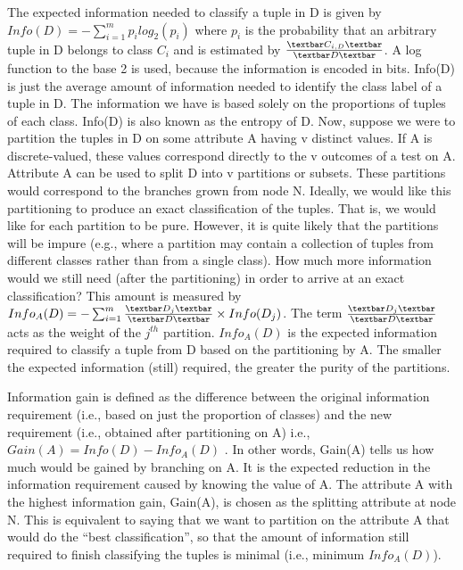 \documentclass{acm_proc_article-sp}
\begin{document}
The expected information needed to classify a tuple in D is given by $Info(D) = - \sum_{i=1}^{m} p_{i} log_{2}(p_{i})$ where $p_{i}$ is the probability that an arbitrary tuple in D belongs to class $C_{i}$ and is estimated by $\frac{\textbar C_{i,D} \textbar}{\textbar D\textbar}$. A log function to the base 2 is used, because the information is encoded in bits. Info(D) is just the average amount of information needed to identify the class label of a tuple in D. The information we have is based solely on the proportions of tuples of each class. Info(D) is also known as the entropy of D. Now, suppose we were to partition the tuples in D on some attribute A having v distinct values. If A is discrete-valued, these values correspond directly to the v outcomes of a test on A. Attribute A can be used to split D into v partitions or subsets. These partitions would correspond to the branches grown from node N. Ideally, we would like this partitioning to produce an exact classification of the tuples. That is, we would like for each partition to be pure. However, it is quite likely that the partitions will be impure (e.g., where a partition may contain a collection of tuples from different classes rather than from a single class). How much more information would we still need (after the partitioning) in order to arrive at an exact classification? This amount is measured by $Info_{A}(D) = - \sum_{i=1}^{m} \frac{\textbar D_{j}\textbar}{\textbar D \textbar} \times Info(D_{j})$. The term $\frac{\textbar D_{j}\textbar}{\textbar D \textbar}$ acts as the weight of the $j^{th}$ partition. $Info_{A}(D)$ is the expected information required to classify a tuple from D based on the partitioning by A. The smaller the expected information (still) required, the greater the purity of the partitions. 

Information gain is defined as the difference between the original information requirement (i.e., based on just the proportion of classes) and the new requirement (i.e., obtained after partitioning on A) i.e., $Gain(A) = Info(D) - Info_{A}(D)$ . In other words, Gain(A) tells us how much would be gained by branching on A. It is the expected reduction in the information requirement caused by knowing the value of A. The attribute A with the highest information gain, Gain(A), is chosen as the splitting attribute at node N. This is equivalent to saying that we want to partition on the attribute A that would do the ``best classification'', so that the amount of information still required to finish classifying the tuples is minimal (i.e., minimum $Info_{A}(D)$).     ~\cite{F}
\end{document}
